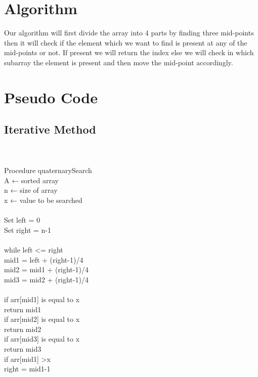 \documentclass[conference]{IEEEtran}
\begin{document}
\section{Algorithm}
Our algorithm will first divide the array into 4 parts by finding three mid-points then it will check if the element which we want to find is present at any of the mid-points or not. If present we will return the index else we will check in which subarray the element is present and then move the mid-point accordingly.

\section{Pseudo Code}
\subsection{Iterative Method}\\\\
Procedure quaternarySearch\\
   A ← sorted array\\
   n ← size of array\\
   x ← value to be searched\\\\
Set left = 0\\
Set right = n-1\\\\
while left \textless=  right\\

mid1 = left + (right-1)/4\\
\indent
mid2 = mid1 + (right-1)/4\\
 \indent
mid3 = mid2 + (right-1)/4\\\\
 \indent
 if arr[mid1] is equal to x\\
 \indent
  \hspace{1cm}return mid1\\
  
if arr[mid2] is equal to x\\
 \indent
  \hspace{1cm}return mid2\\
  
 if arr[mid3] is equal to x\\
 \indent
  \hspace{1cm}return mid3\\
  
  if arr[mid1] \textgreater x\\
  \indent
  \hspace{1cm}right = mid1-1\\
  
\end{document}
